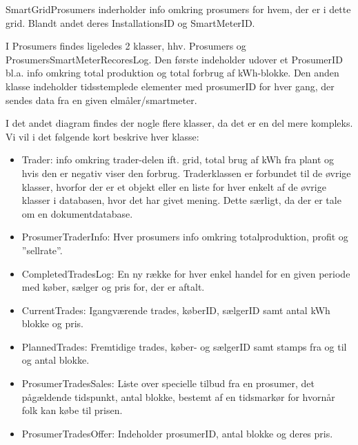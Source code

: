 SmartGridProsumers inderholder info omkring prosumers for hvem, der er i dette grid. Blandt andet deres InstallationsID og SmartMeterID.

I Prosumers findes ligeledes 2 klasser, hhv. Prosumers og ProsumersSmartMeterRecoresLog.
Den første indeholder udover et ProsumerID bl.a. info omkring total produktion og total forbrug af kWh-blokke. Den anden klasse indeholder tidsstemplede elementer med prosumerID for hver gang, der sendes data fra en given elmåler/smartmeter.


I det andet diagram findes der nogle flere klasser, da det er en del mere kompleks. Vi vil i det følgende kort beskrive hver klasse:
\begin{itemize}

\item Trader: info omkring trader-delen ift. grid, total brug af kWh fra plant og hvis den er negativ viser den forbrug. Traderklassen er forbundet til de øvrige klasser, hvorfor der er et objekt eller en liste for hver enkelt af de øvrige klasser i databasen, hvor det har givet mening. Dette særligt, da der er tale om en dokumentdatabase.
\item ProsumerTraderInfo: Hver prosumers info omkring totalproduktion, profit og ”sellrate”.
\item CompletedTradesLog: En ny række for hver enkel handel for en given periode med køber, sælger og pris for, der er aftalt.
\item CurrentTrades: Igangværende trades, køberID, sælgerID samt antal kWh blokke og pris.
\item PlannedTrades: Fremtidige trades, køber- og sælgerID samt stamps fra og til og antal blokke.
\item ProsumerTradesSales: Liste over specielle tilbud fra en prosumer, det pågældende tidspunkt, antal blokke, bestemt af en tidsmarkør for hvornår folk kan købe til prisen. 
\item ProsumerTradesOffer: Indeholder prosumerID, antal blokke og deres pris.
\end{itemize}




    

